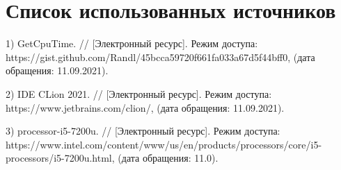 \documentclass[utf8x, 12pt]{G7-32}
\begin{document}
\frontmatter %



\tableofcontents
\pagebreak



\mainmatter %






\backmatter %

%
\chapter{Список использованных источников}
\label{ch:resources}
    1) GetCpuTime.
       // [Электронный ресурс].
       Режим доступа: https://gist.github.com/Ran\linebreak dl/45bcca59720f661fa033a67d5f44bff0, (дата обращения: 11.09.2021).

    2) IDE CLion 2021.
       //  [Электронный  ресурс].
       Режим  доступа: https://www.jetbrains.com\linebreak /clion/, (дата обращения: 11.09.2021).

    3) processor-i5-7200u.
       // [Электронный ресурс].
       Режим доступа: https://www.intel.com/\linebreak content/www/us/en/products/processors/core/i5-processors/i5-7200u.html, (дата обращения: 11.0).
\end{document}
